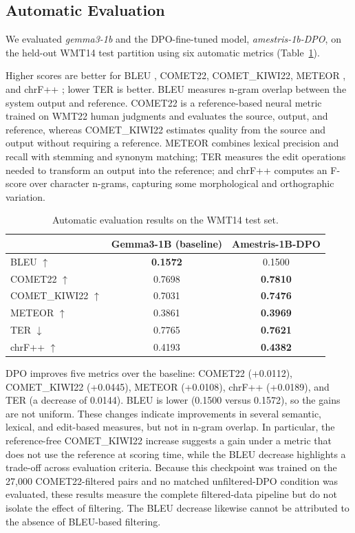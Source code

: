 \documentclass[conference]{IEEEtran}
\begin{document}
\subsection{Automatic Evaluation}
We evaluated \textit{gemma3-1b} and the DPO-fine-tuned model, \textit{amestris-1b-DPO}, on the held-out WMT14 test partition using six automatic metrics (Table~\ref{tab:results}).

Higher scores are better for BLEU \cite{b10}, COMET22, COMET\_KIWI22, METEOR \cite{b16}, and chrF++ \cite{b18}; lower TER \cite{b17} is better. BLEU measures n-gram overlap between the system output and reference. COMET22 is a reference-based neural metric trained on WMT22 human judgments \cite{b15} and evaluates the source, output, and reference, whereas COMET\_KIWI22 estimates quality from the source and output without requiring a reference. METEOR combines lexical precision and recall with stemming and synonym matching; TER measures the edit operations needed to transform an output into the reference; and chrF++ computes an F-score over character n-grams, capturing some morphological and orthographic variation.

\begin{table}[ht]
    \centering
    \caption{Automatic evaluation results on the WMT14 test set.}
    \begin{tabular}{|l|c|c|}
        \hline
        & Gemma3-1B (baseline) & Amestris-1B-DPO \\ \hline
        BLEU $\uparrow$ & \textbf{0.1572} & 0.1500 \\ \hline
        COMET22 $\uparrow$ & 0.7698 & \textbf{0.7810} \\ \hline
        COMET\_KIWI22 $\uparrow$ & 0.7031 & \textbf{0.7476} \\ \hline
        METEOR $\uparrow$ & 0.3861 & \textbf{0.3969} \\ \hline
        TER $\downarrow$ & 0.7765 & \textbf{0.7621} \\ \hline
        chrF++ $\uparrow$ & 0.4193 & \textbf{0.4382} \\ \hline
    \end{tabular}
    \label{tab:results}
\end{table}

DPO improves five metrics over the baseline: COMET22 (+0.0112), COMET\_KIWI22 (+0.0445), METEOR (+0.0108), chrF++ (+0.0189), and TER (a decrease of 0.0144). BLEU is lower (0.1500 versus 0.1572), so the gains are not uniform. These changes indicate improvements in several semantic, lexical, and edit-based measures, but not in n-gram overlap. In particular, the reference-free COMET\_KIWI22 increase suggests a gain under a metric that does not use the reference at scoring time, while the BLEU decrease highlights a trade-off across evaluation criteria. Because this checkpoint was trained on the 27,000 COMET22-filtered pairs and no matched unfiltered-DPO condition was evaluated, these results measure the complete filtered-data pipeline but do not isolate the effect of filtering. The BLEU decrease likewise cannot be attributed to the absence of BLEU-based filtering.
\end{document}
